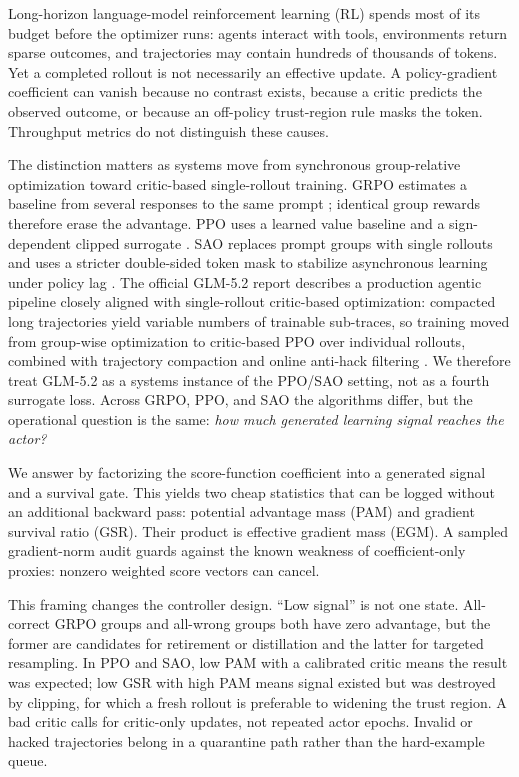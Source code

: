 \documentclass{article}
\begin{document}
Long-horizon language-model reinforcement learning (RL) spends most of its
budget before the optimizer runs: agents interact with tools, environments
return sparse outcomes, and trajectories may contain hundreds of thousands of
tokens.  Yet a completed rollout is not necessarily an effective update.  A
policy-gradient coefficient can vanish because no contrast exists, because a
critic predicts the observed outcome, or because an off-policy trust-region
rule masks the token.  Throughput metrics do not distinguish these causes.

The distinction matters as systems move from synchronous group-relative
optimization toward critic-based single-rollout training.  GRPO estimates a
baseline from several responses to the same prompt \citep{shao2024deepseekmath};
identical group rewards therefore erase the advantage.  PPO uses a learned
value baseline and a sign-dependent clipped surrogate
\citep{schulman2017ppo}.  SAO replaces prompt groups with single rollouts and
uses a stricter double-sided token mask to stabilize asynchronous learning
under policy lag \citep{hou2026sao}.  The official GLM-5.2 report describes a
production agentic pipeline closely aligned with single-rollout critic-based
optimization: compacted long trajectories yield variable numbers of trainable
sub-traces, so training moved from group-wise optimization to critic-based PPO
over individual rollouts, combined with trajectory compaction and online
anti-hack filtering \citep{glm2026glm52}.  We therefore treat GLM-5.2 as a
systems instance of the PPO/SAO setting, not as a fourth surrogate loss.
Across GRPO, PPO, and SAO the algorithms differ, but the operational question is
the same: \emph{how much generated learning signal reaches the actor?}

We answer by factorizing the score-function coefficient into a generated
signal and a survival gate.  This yields two cheap statistics that can be
logged without an additional backward pass: potential advantage mass (PAM)
and gradient survival ratio (GSR).  Their product is effective gradient mass
(EGM).  A sampled gradient-norm audit guards against the known weakness of
coefficient-only proxies: nonzero weighted score vectors can cancel.

This framing changes the controller design.  ``Low signal'' is not one state.
All-correct GRPO groups and all-wrong groups both have zero advantage, but the
former are candidates for retirement or distillation and the latter for
targeted resampling.  In PPO and SAO, low PAM with a calibrated critic means
the result was expected; low GSR with high PAM means signal existed but was
destroyed by clipping, for which a fresh rollout is preferable to widening the
trust region.  A bad critic calls for critic-only updates, not repeated actor
epochs.  Invalid or hacked trajectories belong in a quarantine path rather
than the hard-example queue.
\end{document}

